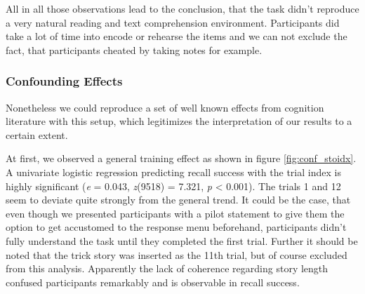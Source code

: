 \documentclass[a4paper,man,natbib,floatsintext,import]{apa6}
\begin{document}
All in all those observations lead to the conclusion, that the task didn't reproduce a very natural reading and text comprehension environment. Participants did take a lot of time into encode or rehearse the items and we can not exclude the fact, that participants cheated by taking notes for example.

\subsubsection{Confounding Effects}
Nonetheless we could reproduce a set of well known effects from cognition literature with this setup, which legitimizes the interpretation of our results to a certain extent.

At first, we observed a general training effect as shown in figure \ref{fig:conf_stoidx}. A univariate logistic regression predicting recall success with the trial index is highly significant (\textit{e} = 0.043, \textit{z}(9518) = 7.321,  \textit{p} < 0.001). The trials 1 and 12 seem to deviate quite strongly from the general trend. It could be the case, that even though we presented participants with a pilot statement to give them the option to get accustomed to the response menu beforehand, participants didn't fully understand the task until they completed the first trial. Further it should be noted that the trick story was inserted as the 11th trial, but of course excluded from this analysis. Apparently the lack of coherence regarding story length confused participants remarkably and is observable in recall success.
\end{document}
